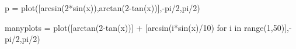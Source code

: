 \documentclass[12pt]{handout}
\begin{document}
\begin{sagesilent}
  p = plot([arcsin(2*sin(x)),arctan(2-tan(x))],-pi/2,pi/2)
\end{sagesilent}
\begin{center}
\end{center}

\pagebreak

\begin{sagesilent}
  manyplots = plot([arctan(2-tan(x))] + [arcsin(i*sin(x)/10) for i in range(1,50)],-pi/2,pi/2)
\end{sagesilent}
\begin{center}
\end{center}




\end{document}
